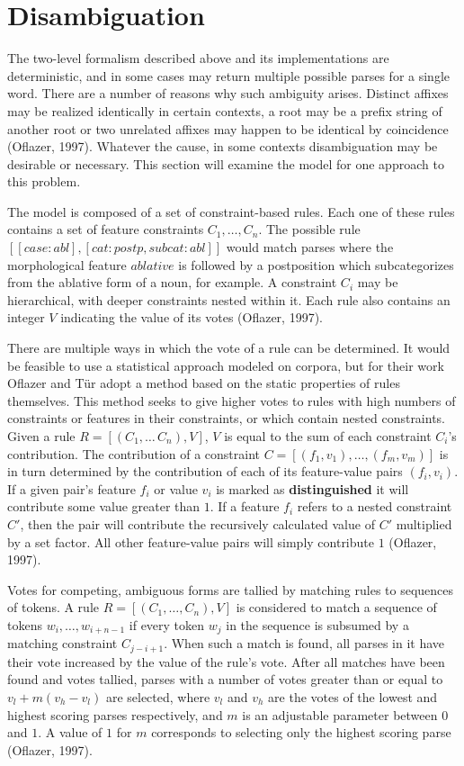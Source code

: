 \documentclass[12pt]{article}
\begin{document}
\section{Disambiguation}
The two-level formalism described above and its implementations are deterministic, and in some cases may return multiple possible parses for a single word.  There are a number of reasons why such ambiguity arises. Distinct affixes may be realized identically in certain contexts, a root may be a prefix string of another root or two unrelated affixes may happen to be identical by coincidence (Oflazer, 1997). Whatever the cause, in some contexts disambiguation may be desirable or necessary. This section will examine the model for one approach to this problem.

The model is composed of a set of constraint-based rules. Each one of these rules contains a set of feature constraints $C_1,\dots,C_n$. The possible rule $[[case:abl],[cat:postp,subcat:abl]]$ would match parses where the morphological feature $ablative$ is followed by a postposition which subcategorizes from the ablative form of a noun, for example. A constraint $C_i$ may be hierarchical, with deeper constraints nested within it. Each rule also contains an integer $V$ indicating the value of its votes (Oflazer, 1997).

There are multiple ways in which the vote of a rule can be determined. It would be feasible to use a statistical approach modeled on corpora, but for their work Oflazer and T\"{u}r adopt a method based on the static properties of rules themselves. This method seeks to give higher votes to rules with high numbers of constraints or features in their constraints, or which contain nested constraints. Given a rule $R = [(C_1,\dots\,C_n),V]$, $V$ is equal to the sum of each constraint $C_i$'s contribution. The contribution of a constraint $C = [(f_1,v_1),\dots,(f_m,v_m)]$ is in turn determined by the contribution of each of its feature-value pairs $(f_i,v_i)$. If a given pair's feature $f_i$ or value $v_i$ is marked as \textbf{distinguished} it will contribute some value greater than $1$. If a feature $f_i$ refers to a nested constraint $C'$, then the pair will contribute the recursively calculated value of $C'$ multiplied by a set factor. All other feature-value pairs will simply contribute $1$ (Oflazer, 1997).

Votes for competing, ambiguous forms are tallied by matching rules to sequences of tokens. A rule $R = [(C_1,\dots,C_n),V]$ is considered to match a sequence of tokens $w_i,\dots,w_{i+n-1}$ if every token $w_j$ in the sequence is subsumed by a matching constraint $C_{j-i+1}$. When such a match is found, all parses in it have their vote increased by the value of the rule's vote. After all matches have been found and votes tallied, parses with a number of votes greater than or equal to $v_l + m(v_h - v_l)$ are selected, where $v_l$ and $v_h$ are the votes of the lowest and highest scoring parses respectively, and $m$ is an adjustable parameter between $0$ and $1$. A value of $1$ for $m$ corresponds to selecting only the highest scoring parse (Oflazer, 1997).
\end{document}
